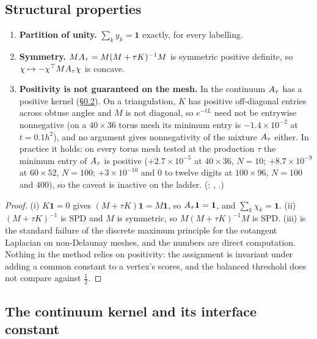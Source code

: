 \documentclass[11pt,a4paper]{article}
\begin{document}
\subsection{Structural properties}
\label{sec:structure}

\begin{prop}
\label{prop:structure}
\begin{enumerate}[label=(\roman*), itemsep=1pt]
  \item \textbf{Partition of unity.} $\sum_k y_k = \mathbf 1$ exactly, for every
    labelling.
  \item \textbf{Symmetry.} $MA_\tau = M(M + \tau K)^{-1}M$ is symmetric positive
    definite, so $\chi \mapsto -\chi^\top M A_\tau \chi$ is concave.
  \item \textbf{Positivity is not guaranteed on the mesh.} In the continuum
    $A_\tau$ has a positive kernel (\S\ref{sec:kernel}). On a triangulation, $K$ has
    positive off-diagonal entries across obtuse angles and $M$ is not diagonal, so
    $e^{-tL}$ need not be entrywise nonnegative (on a $40 \times 36$ torus mesh its
    minimum entry is $-1.4 \times 10^{-2}$ at $t = 0.1 h^2$), and no argument
    gives nonnegativity of the mixture $A_\tau$ either. In practice it holds: on
    every torus mesh tested at the production $\tau$ the minimum entry of $A_\tau$
    is positive ($+2.7 \times 10^{-5}$ at $40 \times 36$, $N = 10$;
    $+8.7 \times 10^{-9}$ at $60 \times 52$, $N = 100$; $+3 \times 10^{-10}$ and
    $0$ to twelve digits at $100 \times 96$, $N = 100$ and $400$), so the caveat
    is inactive on the ladder. (:
    , .)
\end{enumerate}
\end{prop}
\begin{proof}
(i) $K\mathbf 1 = 0$ gives $(M + \tau K)\mathbf 1 = M\mathbf 1$, so
$A_\tau \mathbf 1 = \mathbf 1$, and $\sum_k \chi_k = \mathbf 1$. (ii) $(M+\tau K)^{-1}$
is SPD and $M$ is symmetric, so $M(M+\tau K)^{-1}M$ is SPD. (iii) is the standard
failure of the discrete maximum principle for the cotangent Laplacian on
non-Delaunay meshes, and the numbers are direct computation. Nothing in the
method relies on positivity: the assignment is invariant under adding a common
constant to a vertex's scores, and the balanced threshold does not compare
against $\tfrac12$.
\end{proof}

\subsection{The continuum kernel and its interface constant}
\label{sec:kernel}
\end{document}
